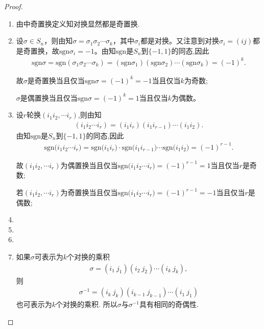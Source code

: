 \documentclass[../../main.tex]{subfiles}%
\begin{document}
\begin{proof}
\begin{enumerate}[(1)]
\item 由中奇置换定义知对换显然都是奇置换.

\item 设$\sigma \in S_n$，则由知$\sigma = \sigma_1\sigma_2\cdots\sigma_k$，其中$\sigma_i$都是对换。又注意到对换$\sigma_i = (ij)$都是奇置换，故$\text{sgn} \sigma_i = -1$。由知$\text{sgn}$是$S_n$到$\{-1,1\}$的同态,因此
\begin{align*}
\text{sgn} \sigma = \text{sgn}(\sigma_1\sigma_2\cdots\sigma_k) = (\text{sgn} \sigma_1)(\text{sgn} \sigma_2)\cdots(\text{sgn} \sigma_k) = (-1)^k.
\end{align*}

故$\sigma$是奇置换当且仅当$\text{sgn} \sigma = (-1)^k = -1$当且仅当$k$为奇数;

$\sigma$是偶置换当且仅当$\text{sgn} \sigma = (-1)^k = 1$当且仅当$k$为偶数。

\item 设$r$轮换$(i_1i_2,\cdots i_r)$,则由知
\begin{align*}
(i_1i_2\cdots i_r)=(i_1i_r)(i_1i_{r-1})\cdots (i_1i_2).
\end{align*}
由知$\text{sgn}$是$S_n$到$\{-1,1\}$的同态,因此
\begin{align*}
\text{sgn}\mathrm{(}i_1i_2\cdots i_r)=\text{sgn}\mathrm{(}i_1i_r)\cdot \text{sgn}\mathrm{(}i_1i_{r-1})\cdots \text{sgn}\mathrm{(}i_1i_2)=\left( -1 \right) ^{r-1}.
\end{align*}

故$(i_1i_2,\cdots i_r)$为偶置换当且仅当$\text{sgn}\mathrm{(}i_1i_2\cdots i_r) = (-1)^{r-1} = 1$当且仅当$r$是奇数;

若$(i_1i_2,\cdots i_r)$为奇置换当且仅当$\text{sgn}\mathrm{(}i_1i_2\cdots i_r) = (-1)^{r-1} = -1$当且仅当$r$是偶数;

\item 

\item 

\item 

\item 如果$\sigma$可表示为$k$个对换的乘积
\begin{align*}
\sigma = (i_1\ j_1)(i_2\ j_2)\cdots(i_k\ j_k),
\end{align*}
则
\begin{align*}
\sigma^{-1} = (i_k\ j_k)(i_{k-1}\ j_{k-1})\cdots(i_1\ j_1)
\end{align*}
也可表示为$k$个对换的乘积. 所以$\sigma$与$\sigma^{-1}$具有相同的奇偶性.
\end{enumerate}
\end{proof}
\end{document}
